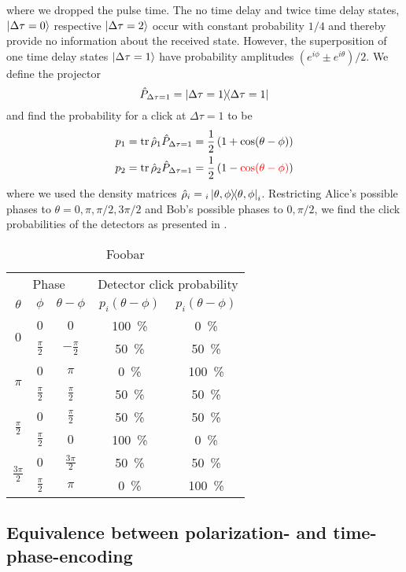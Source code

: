 where we dropped the pulse time.
The no time delay and twice time delay states, $\ket{\Delta\tau=0}$ respective $\ket{\Delta\tau=2}$ occur with constant probability $1/4$ and thereby provide no information about the received state.
However, the superposition of one time delay states $\ket{\Delta\tau=1}$ have probability amplitudes $(e^{i\phi}\pm e^{i\theta})/2$.
We define the projector
\begin{equation}
	\hat{P}_{\Delta\tau=1}
	=
	\ketbra{\Delta\tau=1}
\end{equation}
and find the probability for a click at $\Delta\tau=1$ to be
\begin{align}
	p_1
	&=
	\trace{\hat\rho_1\hat{P}_{\Delta\tau=1}}
	=
	\frac{1}{2}
	\left(1+\cos(\theta-\phi)\right)
	\\
	p_2
	&=
	\trace{\hat\rho_2\hat{P}_{\Delta\tau=1}}
	=
	\frac{1}{2}
	\left(1-\textcolor{red}{\cos(\theta-\phi)}\right)
\end{align}
where we used the density matrices $\hat\rho_i={}_i\ketbra{\theta,\phi}_i$.
Restricting Alice's possible phases to $\theta=0,\pi,\pi/2,3\pi/2$ and Bob's possible phases to $0,\pi/2$, we find the click probabilities of the detectors as presented in .
\begin{table}[htb]
	\centering
	\begin{tabular}{ccccc}
		\toprule
		\multicolumn{3}{c}{Phase} & \multicolumn{2}{c}{Detector click probability} \\
		\cmidrule{1-3}
		\cmidrule{4-5}
		$\theta$ & $\phi$ & $\theta-\phi$ & $p_i(\theta-\phi)$ & $p_i(\theta-\phi)$ \\
		\midrule
		\multirow{2}{*}{$0$} & $0$ & $0$ & \SI{100}{\percent} & \SI{0}{\percent} \\
		& $\frac{\pi}{2}$ & $-\frac{\pi}{2}$ & \SI{50}{\percent} & \SI{50}{\percent} \\
		\cmidrule{1-3}
		\multirow{2}{*}{$\pi$} & $0$ & $\pi$ & \SI{0}{\percent} & \SI{100}{\percent} \\
		& $\frac{\pi}{2}$ & $\frac{\pi}{2}$ & \SI{50}{\percent} & \SI{50}{\percent} \\
		\cmidrule{1-3}
		\multirow{2}{*}{$\frac{\pi}{2}$} & $0$ & $\frac{\pi}{2}$ & \SI{50}{\percent} & \SI{50}{\percent} \\
		& $\frac{\pi}{2}$ & $0$ & \SI{100}{\percent} & \SI{0}{\percent} \\
		\cmidrule{1-3}
		\multirow{2}{*}{$\frac{3\pi}{2}$} & $0$ & $\frac{3\pi}{2}$ & \SI{50}{\percent} & \SI{50}{\percent} \\
		& $\frac{\pi}{2}$ & $\pi$ & \SI{0}{\percent} & \SI{100}{\percent} \\
		\bottomrule
	\end{tabular}
	\caption{Foobar}\label{tab:tp_bb84_probabilities}
\end{table}

\subsection{Equivalence between polarization- and time-phase-encoding}
